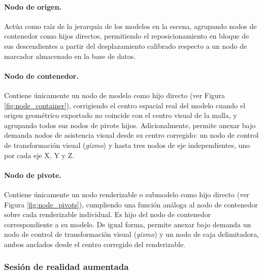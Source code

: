             \paragraph{Nodo de origen.}

                Actúa como raíz de la jerarquía de los modelos en la escena, agrupando nodos de contenedor como hijos directos, permitiendo el reposicionamiento en bloque de sus descendientes a partir del desplazamiento calibrado respecto a un nodo de marcador almacenado en la base de datos.

            \paragraph{Nodo de contenedor.}

                Contiene únicamente un nodo de modelo como hijo directo (ver Figura \ref{fig:node_container}), corrigiendo el centro espacial real del modelo cuando el origen geométrico exportado no coincide con el centro visual de la malla, y agrupando todos sus nodos de pivote hijos. Adicionalmente, permite anexar bajo demanda nodos de asistencia visual desde su centro corregido: un nodo de control de transformación visual (\textit{gizmo}) y hasta tres nodos de eje independientes, uno por cada eje X, Y y Z.

                

            \paragraph{Nodo de pivote.}

                Contiene únicamente un nodo renderizable o submodelo como hijo directo (ver Figura \ref{fig:node_pivots}), cumpliendo una función análoga al nodo de contenedor sobre cada renderizable individual. Es hijo del nodo de contenedor correspondiente a su modelo. De igual forma, permite anexar bajo demanda un nodo de control de transformación visual (\textit{gizmo}) y un nodo de caja delimitadora, ambos anclados desde el centro corregido del renderizable.

                

        \subsubsection{Sesión de realidad aumentada}

